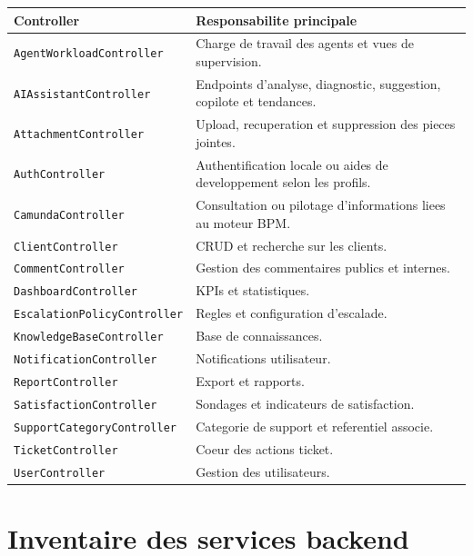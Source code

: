 \documentclass[12pt,a4paper,oneside]{report}
\begin{document}
\begin{longtable}{>{\raggedright\arraybackslash}p{4.5cm} >{\raggedright\arraybackslash}p{9cm}}
\toprule
Controller & Responsabilite principale \\
\midrule
\texttt{AgentWorkloadController} & Charge de travail des agents et vues de supervision. \\
\texttt{AIAssistantController} & Endpoints d'analyse, diagnostic, suggestion, copilote et tendances. \\
\texttt{AttachmentController} & Upload, recuperation et suppression des pieces jointes. \\
\texttt{AuthController} & Authentification locale ou aides de developpement selon les profils. \\
\texttt{CamundaController} & Consultation ou pilotage d'informations liees au moteur BPM. \\
\texttt{ClientController} & CRUD et recherche sur les clients. \\
\texttt{CommentController} & Gestion des commentaires publics et internes. \\
\texttt{DashboardController} & KPIs et statistiques. \\
\texttt{EscalationPolicyController} & Regles et configuration d'escalade. \\
\texttt{KnowledgeBaseController} & Base de connaissances. \\
\texttt{NotificationController} & Notifications utilisateur. \\
\texttt{ReportController} & Export et rapports. \\
\texttt{SatisfactionController} & Sondages et indicateurs de satisfaction. \\
\texttt{SupportCategoryController} & Categorie de support et referentiel associe. \\
\texttt{TicketController} & Coeur des actions ticket. \\
\texttt{UserController} & Gestion des utilisateurs. \\
\bottomrule
\end{longtable}

\chapter{Inventaire des services backend}
\end{document}
